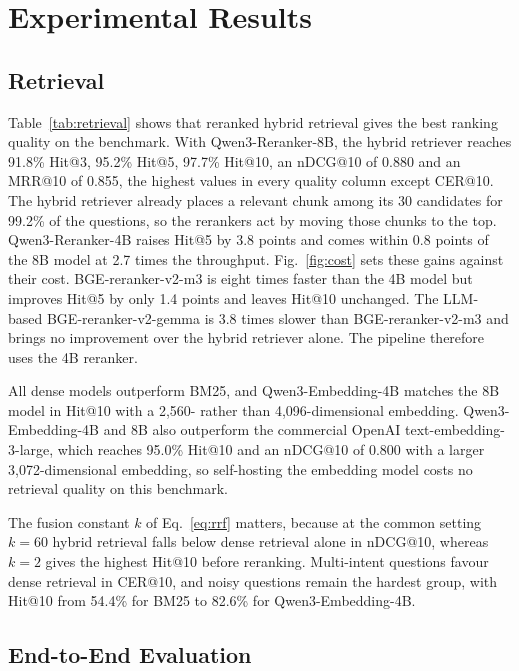 \section{Experimental Results}\label{sec:results}
\suppressfloats[t]

\subsection{Retrieval}\label{sec:results-retrieval}




Table~\ref{tab:retrieval} shows that reranked hybrid retrieval gives the best ranking quality on the benchmark. With Qwen3-Reranker-8B, the hybrid retriever reaches 91.8\% Hit@3, 95.2\% Hit@5, 97.7\% Hit@10, an nDCG@10 of 0.880 and an MRR@10 of 0.855, the highest values in every quality column except CER@10. The hybrid retriever already places a relevant chunk among its 30 candidates for 99.2\% of the questions, so the rerankers act by moving those chunks to the top. Qwen3-Reranker-4B raises Hit@5 by 3.8 points and comes within 0.8 points of the 8B model at 2.7 times the throughput. Fig.~\ref{fig:cost} sets these gains against their cost. BGE-reranker-v2-m3 is eight times faster than the 4B model but improves Hit@5 by only 1.4 points and leaves Hit@10 unchanged. The LLM-based BGE-reranker-v2-gemma is 3.8 times slower than BGE-reranker-v2-m3 and brings no improvement over the hybrid retriever alone. The pipeline therefore uses the 4B reranker.

All dense models outperform BM25, and Qwen3-Embedding-4B matches the 8B model in Hit@10 with a 2{,}560- rather than 4{,}096-dimensional embedding. Qwen3-Embedding-4B and 8B also outperform the commercial OpenAI text-embedding-3-large, which reaches 95.0\% Hit@10 and an nDCG@10 of 0.800 with a larger 3{,}072-dimensional embedding, so self-hosting the embedding model costs no retrieval quality on this benchmark.

The fusion constant $k$ of Eq.~\ref{eq:rrf} matters, because at the common setting $k=60$ hybrid retrieval falls below dense retrieval alone in nDCG@10, whereas $k=2$ gives the highest Hit@10 before reranking. Multi-intent questions favour dense retrieval in CER@10, and noisy questions remain the hardest group, with Hit@10 from 54.4\% for BM25 to 82.6\% for Qwen3-Embedding-4B.

\subsection{End-to-End Evaluation}\label{sec:results-e2e}

